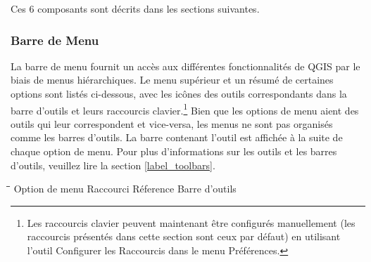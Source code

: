 Ces 6 composants sont décrits dans les sections suivantes.

\subsubsection{Barre de Menu}\label{label_menubar}

La barre de menu fournit un accès aux différentes fonctionnalités de QGIS par le biais de menus hiérarchiques. Le menu supérieur et un résumé de certaines options sont listés ci-dessous, avec les icônes des outils correspondants dans la barre d'outils et leurs raccourcis clavier.\footnote{Les raccourcis clavier peuvent maintenant être configurés manuellement (les raccourcis présentés dans cette section sont ceux par défaut) en utilisant l'outil Configurer les Raccourcis dans le menu Préférences.} Bien que les options de menu aient des outils qui leur correspondent et vice-versa, les menus ne sont pas organisés comme les barres d'outils. La barre contenant l'outil est affichée à la suite de chaque option de menu. Pour plus d'informations sur les outils et les barres d'outils, veuillez lire la section \ref{label_toolbars}.

\begin{tabbing}
\hspace{5.5cm}\=\hspace{3cm}\=\hspace{3.5cm}\= \kill
\hspace{1cm} Option de menu \> Raccourci \> Réference \> Barre d'outils\\
\end{tabbing}

